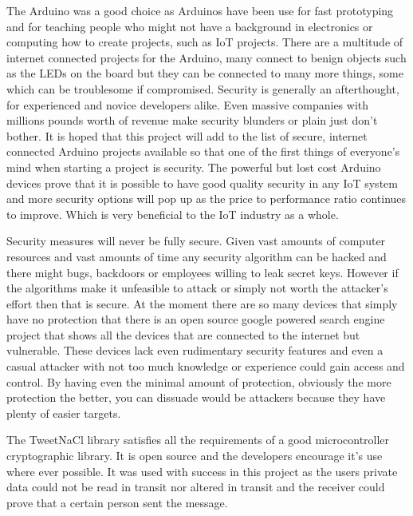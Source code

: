 The Arduino was a good choice as Arduinos have been use for fast prototyping and for teaching people who might not have a background in electronics or computing how to create projects, such as IoT projects. There are a multitude of internet connected projects for the Arduino, many connect to benign objects such as the LEDs on the board but they can be connected to many more things, some which can be troublesome if compromised. Security is generally an afterthought, for experienced and novice developers alike. Even massive companies with millions pounds worth of revenue make security blunders or plain just don't bother. It is hoped that this project will add to the list of secure, internet connected Arduino projects available so that one of the first things of everyone's mind when starting a project is security. The powerful but lost cost Arduino devices prove that it is possible to have good quality security in any IoT system and more security options will pop up as the price to performance ratio continues to improve. Which is very beneficial to the IoT industry as a whole.

Security measures will never be fully secure. Given vast amounts of computer resources and vast amounts of time any security algorithm can be hacked and there might bugs, backdoors or employees willing to leak secret keys. However if the algorithms make it unfeasible to attack or simply not worth the attacker's effort then that is secure. At the moment there are so many devices that simply have no protection that there is an open source google powered search engine project that shows all the devices that are connected to the internet but vulnerable\cite{censys}. These devices lack even rudimentary security features and even a casual attacker with not too much knowledge or experience could gain access and control. By having even the minimal amount of protection, obviously the more protection the better, you can dissuade would be attackers because they have plenty of easier targets.

The TweetNaCl library satisfies all the requirements of a good microcontroller cryptographic library. It is open source and the developers encourage it's use where ever possible. It was used with success in this project as the users private data could not be read in transit nor altered in transit and the receiver could prove that a certain person sent the message. 
